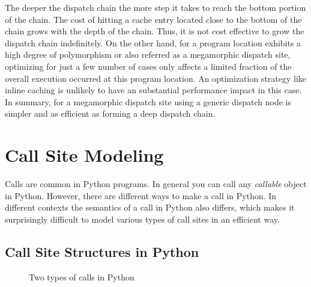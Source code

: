 The deeper the dispatch chain the more step it takes to reach the bottom portion of the chain.
The cost of hitting a cache entry located close to the bottom of the chain grows with the depth of the chain.
Thus, it is not cost effective to grow the dispatch chain indefinitely.
On the other hand, for a program location exhibits a high degree of polymorphism or also referred as a megamorphic dispatch site,
optimizing for just a few number of cases only affects a limited fraction of the overall execution occurred at this program location.
An optimization strategy like inline caching is unlikely to have an substantial performance impact in this case.
In summary, for a megamorphic dispatch site using a generic dispatch node is simpler and as efficient as forming a deep dispatch chain.

\section{Call Site Modeling}

Calls are common in Python programs.
In general you can call any \emph{callable} object in Python.
However, there are different ways to make a call in Python.
In different contexts the semantics of a call in Python also differs, which makes it surprisingly difficult to model various types of call sites in an efficient way.

\subsection{Call Site Structures in Python}
\label{sec:ch5-structure-of-call-sites}

\begin{figure}
\centering
{}
\caption{Two types of calls in Python}
\label{fig:ch5-call-site-synteax-code}
\end{figure}

